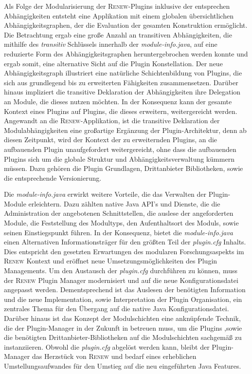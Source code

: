 Als Folge der Modularisierung der \textsc{Renew}-Plugins inklusive der entsprechen Abhängigkeiten entsteht eine Applikation mit einem globalen übersichtlichen Abhängigkeitsgraphen, der die Evaluation der gesamten Konstruktion ermöglicht. Die Betrachtung ergab eine große Anzahl an transitiven Abhängigkeiten, die mithilfe des \textit{transitiv} Schlüssels innerhalb der \textit{module-info.java}, auf eine reduzierte Form des Abhängigkeitsgraphen heruntergebrochen werden konnte und ergab somit, eine alternative Sicht auf die Plugin Konstellation. Der neue Abhängigkeitsgraph illustriert eine natürliche Schichtenbildung von Plugins, die sich aus grundlegend bis zu erweiterten Fähigkeiten zusammensetzen. Darüber hinaus impliziert die transitive Deklaration der Abhängigkeiten ihre Delegation an Module, die dieses nutzen möchten. In der Konsequenz kann der gesamte Kontext eines Plugins auf Plugins, die dieses erweitern, weitergereicht werden. \newline
Angewandt an die \textsc{Renew}-Applikation, ist die transitive Deklaration der Modulabhängigkeiten eine großartige Ergänzung der Plugin-Architektur, denn ab diesen Zeitpunkt, wird der Kontext der zu erweiternden Plugins, an die aufbauenden Plugin unaufgefordert weitergereicht, ohne dass die aufbauenden Plugins sich um die globale Struktur und Abhängigkeitsverwaltung kümmern müssen. Dazu gehören die Plugin Grundlagen, Drittanbieter Bibliotheken, sowie die entsprechende Versionierung.\bigbreak

Die \textit{module-info.java} erwirkt weitere Vorteile, die das Verwalten der Plugin-Module erleichtern. Dazu zählten native Java API's und Dienste, die die Administration der angebotenen Schnittstellen, die auslese der angeforderten Module, die Feststellung des Modultyps, den Aufenthaltsort des Moduls, sowie seinen Einstiegspunkt führen. In der Konsequenz, bietet die \textit{module-info.java} einen Alternativen Informationsträger für den größten Teil der \textit{plugin.cfg} Inhalts. Dies entspricht den gesetzten Erwartungen des modularen Forschungsaspekts im \textsc{Renew} Kontext und eröffnet neue Umsetzungsmöglichkeiten des Plugin Managements.\newline
Um den Austausch der \textit{plugin.cfg} durchführen zu können, muss der \textsc{Renew} Plugin Manager modernisiert und auf die neue Konfigurationsdatei angepasst werden. Dementsprechend ist das Auslesen der benötigten Information und die neue Implementation, sowie Interpretation der Plugin Organisation, ein zentrales Thema für den Übergang auf die native Java Konfigurationsdatei. Darüber hinaus ist das Konzept der Modulschichten eine anknüpfende Technik, die der Plugin-Manager in der Zukunft in betreuen muss, um die Plugins ,sowie die benötigten Drittanbieter-Bibliotheken auf die Modulschichten sachgemäß zu instanziieren.\newline
Obwohl die \textit{plugin.cfg} abgelöst werden kann, bleibt der Plugin-Manager das Herzstück von \textsc{Renew} und bedarf eines erheblichen Umstellungsaufwandes für den Umstieg auf die neu eingeführten Java Features.\bigbreak

